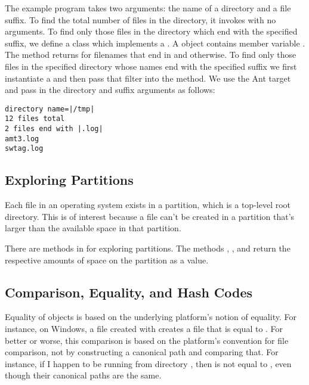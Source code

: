 The example program  takes two arguments:
the name of a directory and a file suffix. To find the total number of
files in the directory, it invokes  with no arguments.
%
% 
To find only those files in the directory which end with the specified suffix,
we define a class  which implements a .
A  object contains member variable .
The  method returns  for filenames that 
end in  and  otherwise.
%
%
To find only those files in the specified directory whose names 
end with the specified suffix we first instantiate a 
 and then pass that filter
into the  method.
%
%
We use the Ant target  and pass in the
directory and suffix arguments as follows:
%
%
\begin{verbatim}
directory name=|/tmp|
12 files total
2 files end with |.log|
amt3.log
swtag.log
\end{verbatim}
%


\subsection{Exploring Partitions}

Each file in an operating system exists in a partition, which is a
top-level root directory.  This is of interest because a file can't be
created in a partition that's larger than the available space in that
partition.

There are methods in  for exploring partitions.  The
methods , , and
 return the respective amounts of space on the
partition as a  value.


\subsection{Comparison, Equality, and Hash Codes}\label{section:io-files-equality}

Equality of  objects is based on the underlying platform's
notion of equality.  For instance, on Windows, a file created with
 creates a file that is equal to .  For better or worse, this comparison is based on the
platform's convention for file comparison, not by constructing a
canonical path and comparing that.  For instance, if I happen to
be running from directory , then 
 is not equal to 
, even though their canonical paths are
the same.


